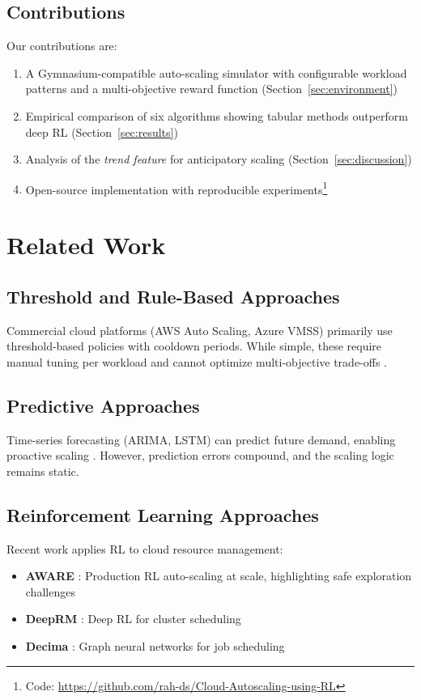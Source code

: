 \documentclass[conference]{IEEEtran}
\begin{document}
\subsection{Contributions}
Our contributions are:
\begin{enumerate}
    \item A Gymnasium-compatible auto-scaling simulator with configurable workload patterns and a multi-objective reward function (Section~\ref{sec:environment})
    \item Empirical comparison of six algorithms showing tabular methods outperform deep RL (Section~\ref{sec:results})
    \item Analysis of the \textit{trend feature} for anticipatory scaling (Section~\ref{sec:discussion})
    \item Open-source implementation with reproducible experiments\footnote{Code: \url{https://github.com/rah-ds/Cloud-Autoscaling-using-RL}}
\end{enumerate}

\section{Related Work}

\subsection{Threshold and Rule-Based Approaches}
Commercial cloud platforms (AWS Auto Scaling, Azure VMSS) primarily use threshold-based policies with cooldown periods. While simple, these require manual tuning per workload and cannot optimize multi-objective trade-offs \cite{garcia2020}.

\subsection{Predictive Approaches}
Time-series forecasting (ARIMA, LSTM) can predict future demand, enabling proactive scaling \cite{xu2022}. However, prediction errors compound, and the scaling logic remains static.

\subsection{Reinforcement Learning Approaches}
Recent work applies RL to cloud resource management:
\begin{itemize}
    \item \textbf{AWARE} \cite{qiu2023}: Production RL auto-scaling at scale, highlighting safe exploration challenges
    \item \textbf{DeepRM} \cite{mao2016}: Deep RL for cluster scheduling
    \item \textbf{Decima} \cite{mao2019}: Graph neural networks for job scheduling
\end{itemize}
\end{document}
